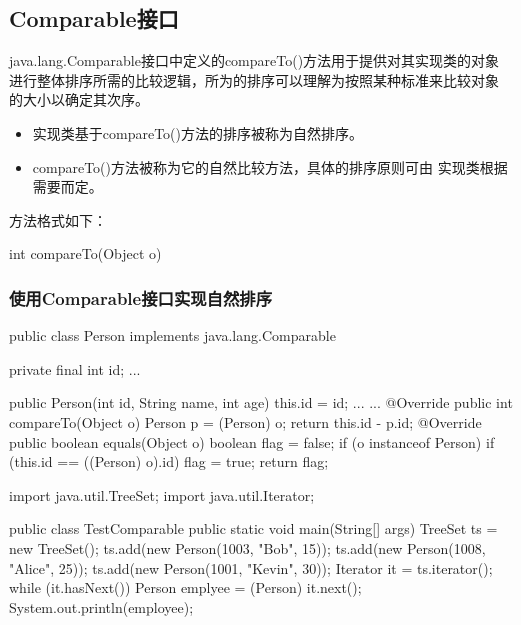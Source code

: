 \subsection{Comparable接口}

java.lang.Comparable接口中定义的compareTo()方法用于提供对其实现类的对象
进行整体排序所需的比较逻辑，所为的排序可以理解为按照某种标准来比较对象
的大小以确定其次序。

\begin{itemize}
\item 实现类基于compareTo()方法的排序被称为{\Blue 自然排序}。
\item compareTo()方法被称为它的{\Blue 自然比较方法}，具体的排序原则可由
  实现类根据需要而定。
\end{itemize}

方法格式如下：

\begin{javaCode}
  int compareTo(Object o) {
  }   
\end{javaCode}


\subsubsection{使用Comparable接口实现自然排序}


\begin{javaCode}
  public class Person implements java.lang.Comparable {
    private final int id;
    ...

    public Person(int id, String name, int age) {
      this.id = id;
      ...
    }
    ...
    @Override
    public int compareTo(Object o) {
      Person p = (Person) o;
      return this.id - p.id;
    }
    @Override
    public boolean equals(Object o) {
      boolean flag = false;
      if (o instanceof Person) {
        if (this.id == ((Person) o).id) {
          flag = true;
        }
      }
      return flag;
    }
  } 
\end{javaCode}


\begin{javaCode}
  import java.util.TreeSet;
  import java.util.Iterator;

  public class TestComparable {
    public static void main(String[] args) {
      TreeSet ts = new TreeSet();
      ts.add(new Person(1003, "Bob", 15));
      ts.add(new Person(1008, "Alice", 25));
      ts.add(new Person(1001, "Kevin", 30));
    }
    Iterator it = ts.iterator();
    while (it.hasNext()) {
      Person emplyee  = (Person) it.next();
      System.out.println(employee);
    }
  }
\end{javaCode}

